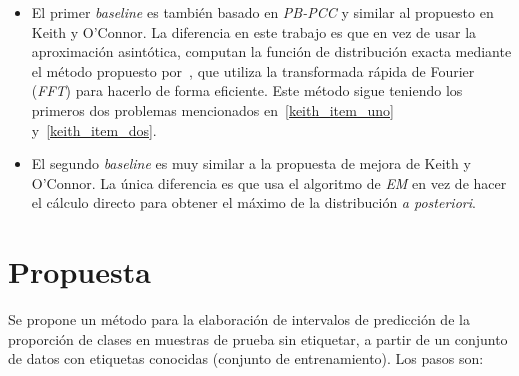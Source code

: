 \begin{itemize}
    \item El primer {\it baseline\/} es también basado en {\it PB-PCC\/} y
    similar al propuesto en Keith y O'Connor. La diferencia en este trabajo es
    que en vez de usar la aproximación asintótica, computan la función de
    distribución exacta mediante el método propuesto
    por~\citet{hong2013computing}, que utiliza la transformada rápida de Fourier
    ({\it FFT\/}) para hacerlo de forma eficiente. Este método sigue teniendo
    los primeros dos problemas mencionados en~\ref{keith_item_uno}
    y~\ref{keith_item_dos}.
    \item El segundo {\it baseline\/} es muy similar a la propuesta de mejora de
    Keith y O'Connor. La única diferencia es que usa el algoritmo de {\it EM\/}
    en vez de hacer el cálculo directo para obtener el máximo de la distribución
    {\it a posteriori}.
\end{itemize}

\section{Propuesta}\label{introduccion:propuesta}

Se propone un método para la elaboración de intervalos de predicción de la
proporción de clases en muestras de prueba sin etiquetar, a partir de un
conjunto de datos con etiquetas conocidas (conjunto de entrenamiento). Los pasos
son:


